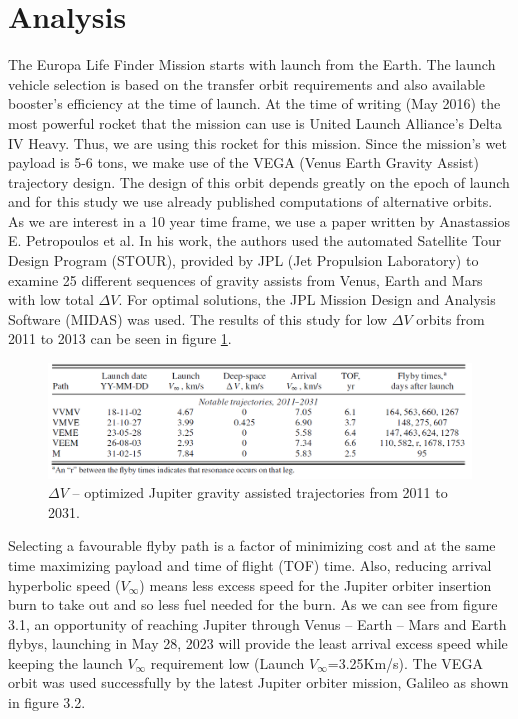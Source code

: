 \section{Analysis}

The Europa Life Finder Mission starts with launch from the Earth. The launch vehicle selection is based on the transfer orbit requirements and also available booster’s efficiency at the time of launch. At the time of writing (May 2016) the most powerful rocket that the mission can use is United Launch Alliance’s Delta IV Heavy. Thus, we are using this rocket for this mission. Since the mission’s wet payload is 5-6 tons, we make use of the VEGA (Venus Earth Gravity Assist) trajectory design. The design of this orbit depends greatly on the epoch of launch and for this study we use already published computations of alternative orbits. As we are interest in a 10 year time frame, we use a paper written by Anastassios E. Petropoulos et al\cite{petropoulos2000a}. In his work, the authors used the automated Satellite Tour Design Program (STOUR), provided by JPL (Jet Propulsion Laboratory) to examine 25 different sequences of gravity assists from Venus, Earth and Mars with low total $\Delta V$. For optimal solutions, the JPL Mission Design and Analysis Software (MIDAS) was used. The results of this study for low $\Delta V$ orbits from 2011 to 2013 can be seen in figure \ref{fig:grav_ass_traj}.

\begin{figure}[htb!]
\centering
\includegraphics[width=1\textwidth]{figures/Orbiter/traj.png}
\caption{$\Delta V$ – optimized Jupiter gravity assisted trajectories from 2011 to 2031. \cite{petropoulos2000a}}\label{fig:grav_ass_traj}
\end{figure}

Selecting a favourable flyby path is a factor of minimizing cost and at the same time maximizing payload and time of flight (TOF) time. Also, reducing arrival hyperbolic speed ($V_{\infty}$) means less excess speed for the Jupiter orbiter insertion burn to take out and so less fuel needed for the burn. As we can see from figure 3.1, an opportunity of reaching Jupiter through Venus – Earth – Mars and Earth flybys, launching in May 28, 2023 will provide the least arrival excess speed while keeping the launch $V_{\infty}$ requirement low (Launch $V_{\infty}$=3.25Km/s). The VEGA orbit was used successfully by the latest Jupiter orbiter mission, Galileo as shown in figure 3.2.

